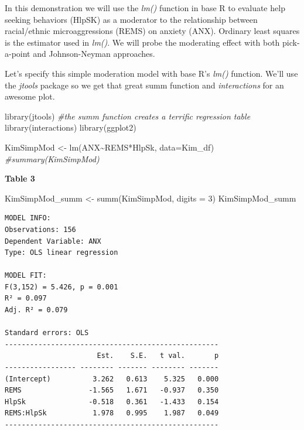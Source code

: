 \documentclass[
]{book}
\newenvironment{Shaded}{\begin{snugshade}}{\end{snugshade}}
\newcommand{\AttributeTok}[1]{\textcolor[rgb]{0.77,0.63,0.00}{#1}}
\newcommand{\CommentTok}[1]{\textcolor[rgb]{0.56,0.35,0.01}{\textit{#1}}}
\newcommand{\DecValTok}[1]{\textcolor[rgb]{0.00,0.00,0.81}{#1}}
\newcommand{\FunctionTok}[1]{\textcolor[rgb]{0.00,0.00,0.00}{#1}}
\newcommand{\NormalTok}[1]{#1}
\newcommand{\OtherTok}[1]{\textcolor[rgb]{0.56,0.35,0.01}{#1}}
\newcommand{\SpecialCharTok}[1]{\textcolor[rgb]{0.00,0.00,0.00}{#1}}
\begin{document}
In this demonstration we will use the \emph{lm()} function in base R to evaluate help seeking behaviors (HlpSK) as a moderator to the relationship between racial/ethnic microaggressions (REMS) on anxiety (ANX). Ordinary least squares is the estimator used in \emph{lm()}. We will probe the moderating effect with both pick-a-point and Johnson-Neyman approaches.

Let's specify this simple moderation model with base R's \emph{lm()} function. We'll use the \emph{jtools} package so we get that great summ function and \emph{interactions} for an awesome plot.

\begin{Shaded}
\begin{Highlighting}[]
\FunctionTok{library}\NormalTok{(jtools) }\CommentTok{\#the summ function creates a terrific regression table}
\FunctionTok{library}\NormalTok{(interactions)}
\FunctionTok{library}\NormalTok{(ggplot2)}

\NormalTok{KimSimpMod }\OtherTok{\textless{}{-}} \FunctionTok{lm}\NormalTok{(ANX}\SpecialCharTok{\textasciitilde{}}\NormalTok{REMS}\SpecialCharTok{*}\NormalTok{HlpSk, }\AttributeTok{data=}\NormalTok{Kim\_df)}
\CommentTok{\#summary(KimSimpMod)}
\end{Highlighting}
\end{Shaded}

\textbf{Table 3}

\begin{Shaded}
\begin{Highlighting}[]
\NormalTok{KimSimpMod\_summ }\OtherTok{\textless{}{-}} \FunctionTok{summ}\NormalTok{(KimSimpMod, }\AttributeTok{digits =} \DecValTok{3}\NormalTok{)}
\NormalTok{KimSimpMod\_summ}
\end{Highlighting}
\end{Shaded}

\begin{verbatim}
MODEL INFO:
Observations: 156
Dependent Variable: ANX
Type: OLS linear regression 

MODEL FIT:
F(3,152) = 5.426, p = 0.001
R² = 0.097
Adj. R² = 0.079 

Standard errors: OLS
---------------------------------------------------
                      Est.    S.E.   t val.       p
----------------- -------- ------- -------- -------
(Intercept)          3.262   0.613    5.325   0.000
REMS                -1.565   1.671   -0.937   0.350
HlpSk               -0.518   0.361   -1.433   0.154
REMS:HlpSk           1.978   0.995    1.987   0.049
---------------------------------------------------
\end{verbatim}
\end{document}

